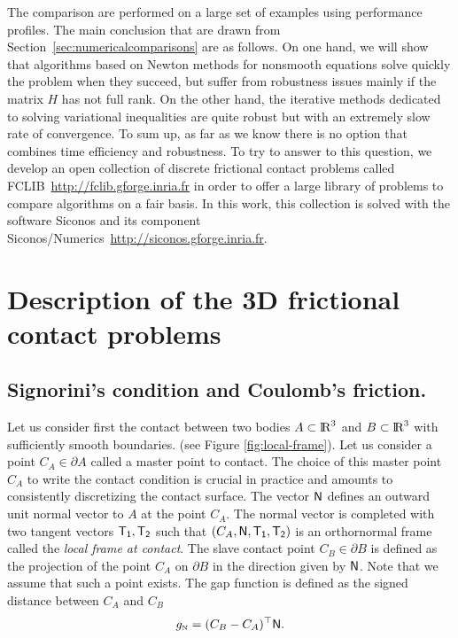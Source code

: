 The comparison are performed on a large set of examples using performance profiles. The main conclusion that are drawn from Section~\ref{sec:numericalcomparisons} are as follows.
On one hand, we will show that algorithms based on Newton methods for nonsmooth equations solve quickly the problem when they succeed, but suffer from robustness issues mainly if the matrix $H$ has not full rank. On the other hand, the
iterative methods dedicated to solving variational inequalities are quite robust but with an extremely slow rate of convergence. To sum up, as far as we know there is no option that combines time efficiency and robustness. To try to answer to this question, we develop an open collection of discrete frictional contact problems called FCLIB~\url{http://fclib.gforge.inria.fr} in order to offer a large library of problems to compare algorithms on a fair basis.  In this work, this collection is solved with the software {\sc Siconos} and its component {\sc Siconos/Numerics}~\url{http://siconos.gforge.inria.fr}\citep{Acary.Bremond.Huber.Perignon2015}.


\clearpage
\section{Description of the 3D frictional contact problems}
\label{sec:description}
\subsection{Signorini's condition and Coulomb's friction.}

Let us consider first the contact between two  bodies $A \subset  \mbox{l\hspace{ -.15em}R}^3$ and $B \subset \mbox{l\hspace{ -.15em}R}^3$ with sufficiently smooth boundaries. (see Figure \ref{fig:local-frame}). Let us consider a point $C_{A} \in \partial A$ called a master point to contact.  The choice of this master point $C_A$ to write the contact condition is crucial in  practice and amounts to consistently discretizing  the contact surface. The vector  ${\sf N}$ defines an outward unit normal vector to $A$ at the point $C_A$. The normal vector is completed with two tangent vectors $\sf T_1, T_2$ such that $(C_A, \sf N, T_1, T_2)$ is an orthornormal frame called the \emph{local frame at contact}. The slave contact point $C_B \in \partial B$ is defined as the projection of the point $C_A$ on $\partial B$ in the direction given by $\sf N$. Note that we assume that such a point exists. The gap function is defined as the signed distance between $C_A$ and $C_B$
\begin{equation}
  \label{eq:gap}
  g_{\n} = (C_B-C_A)^\top  \sf N.
\end{equation}


